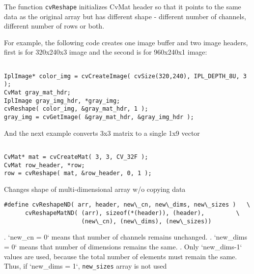 The function \texttt{cvReshape} initializes CvMat header so that it points to the same data as the original array but has different shape - different number of channels, different number of rows or both.

For example, the following code creates one image buffer and two image headers, first is for 320x240x3 image and the second is for 960x240x1 image:

\begin{lstlisting}

IplImage* color_img = cvCreateImage( cvSize(320,240), IPL_DEPTH_8U, 3 );
CvMat gray_mat_hdr;
IplImage gray_img_hdr, *gray_img;
cvReshape( color_img, &gray_mat_hdr, 1 );
gray_img = cvGetImage( &gray_mat_hdr, &gray_img_hdr );

\end{lstlisting}

And the next example converts 3x3 matrix to a single 1x9 vector

\begin{lstlisting}

CvMat* mat = cvCreateMat( 3, 3, CV_32F );
CvMat row_header, *row;
row = cvReshape( mat, &row_header, 0, 1 );

\end{lstlisting}

\label{ReshapeMatND}

Changes shape of multi-dimensional array w/o copying data


\begin{lstlisting}
#define cvReshapeND( arr, header, new\_cn, new\_dims, new\_sizes )   \
      cvReshapeMatND( (arr), sizeof(*(header)), (header),         \
                      (new\_cn), (new\_dims), (new\_sizes))
\end{lstlisting}


\begin{description}
\cvarg{new\_cn}{New number of channels}
. `new\_cn = 0` means that number of channels remains unchanged.
. `new\_dims = 0` means that number of dimensions remains the same.
. Only `new\_dims-1` values are used, because the total number of elements must remain the same. Thus, if `new\_dims = 1`, \texttt{new\_sizes} array is not used
\end{description}

